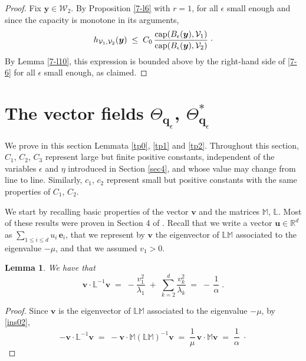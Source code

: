 \documentclass[reqno]{amsart}
\newtheorem{lemma}[theorem]{Lemma}
\newcounter{as}[section]
\newcommand{\mc}[1]{{\mathcal #1}}
\newcommand{\bb}[1]{{\mathbb #1}}
\newcommand{\bs}[1]{{\boldsymbol #1}}
\newcommand{\<}{\langle}
\renewcommand{\>}{\rangle}
\renewcommand{\Cap}{{\rm cap}}
\begin{document}
\begin{proof}
Fix $\bs y \in \mc W_2$. By Proposition \ref{7-l6} with $r=1$, for all
$\epsilon$ small enough and since the capacity is monotone in its
arguments,
\begin{equation*}
h_{\mc V_1, \mc V_2}(\bs y) \;\le\; C_0\,
\frac{\Cap (B_{\epsilon}(\bs y), \mc V_1) }
{\Cap (B_{\epsilon}(\bs y), \mc V_2) }\;\cdot
\end{equation*}
By Lemma \ref{7-l10}, this expression is bounded above by the right-hand side of \eqref{7-6} for all $\epsilon$ small enough, as claimed.
\end{proof}

\section{The vector fields $\Theta_{\bs{q}_{\epsilon}}$,
$\Theta^*_{\bs{q}_{\epsilon}}$}
\label{sec6}

We prove in this section Lemmata \ref{tp0}, \ref{tp1} and \ref{tp2}.
Throughout this section, $C_1$, $C_2$, $C_3$ represent large but
finite positive constants, independent of the variables $\epsilon$ and
$\eta$ introduced in Section \ref{sec4}, and whose value may change
from line to line. Similarly, $c_1$, $c_2$ represent small but
positive constants with the same properties of $C_1$, $C_2$.

We start by recalling basic properties of the vector $\bs v$ and the
matrices $\bb M$, $\bb L$. Most of these results were proven in
Section 4 of \cite{LS1}.  Recall that we write a vector $\bs{u} \in
\bb R^d$ as $\sum_{1\le i\le d} u_{i} \, \bs{e}_{i}$, that we
represent by $\bs v$ the eigenvector of $\bb{L} \bb{M}$ associated to
the eigenvalue $-\mu$, and that we assumed $v_1>0$.

\begin{lemma}
\label{bl1}
We have that
\begin{equation*}
\bs{v}\cdot\bb{L}^{-1}\bs{v}\;=\;-\frac{v_{1}^{2}} {\lambda_{1}} \;+\;
\sum_{k=2}^{d}\frac{v_{k}^{2}}{\lambda_{k}}\;=\;-\, \frac{1}{\alpha}\;.
\end{equation*}
\end{lemma}

\begin{proof}
Since $\bs{v}$ is the eigenvector of $\bb{L} \bb{M}$ associated
to the eigenvalue $-\mu$, by \eqref{ins02},
\begin{equation*}
-\bs{v}\cdot\bb{L}^{-1}\bs{v}\;=\;-\bs{v}\cdot\bb{M}
(\bb{L}\bb {M})^{-1} \bs{v}\;=\;
\frac{1}{\mu}\, \bs{v}\cdot\bb{M}\bs{v}\;=\;\frac{1}{\alpha}\;\cdot
\end{equation*}
\end{proof}
\end{document}
